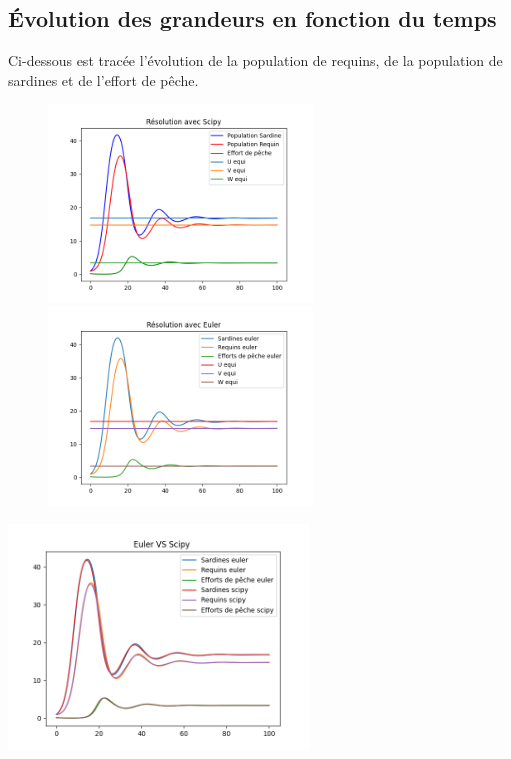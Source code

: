 \documentclass[a4paper, 11pt]{report}%
\begin{document}
        
        \subsection{Évolution des grandeurs en fonction du temps}
        Ci-dessous est tracée l'évolution de la population de requins, de la population de sardines et de l'effort de pêche. 
        \begin{figure}[!h]
    		\begin{minipage}[b]{.4\textwidth}
        		\centering
        		\includegraphics[width=7cm]{figures/Scipy_good_conditions.png}
    		\end{minipage}
    		\hfill
    		\begin{minipage}[b]{.4\textwidth}
        		\centering
       			\includegraphics[width=7cm]{figures/Euler_good_conditions.png}
    		\end{minipage}
    		
		\end{figure}

        \begin{center}
            \includegraphics[width=8cm]{figures/Euler_VS_Scipy_good_conditions.png}
        \end{center}
\end{document}
